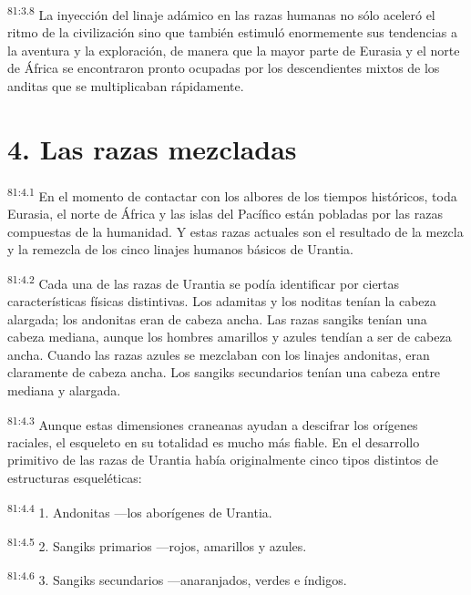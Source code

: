 \par
\textsuperscript{81:3.8} La inyección del linaje adámico en las razas humanas no sólo aceleró el ritmo de la civilización sino que también estimuló enormemente sus tendencias a la aventura y la exploración, de manera que la mayor parte de Eurasia y el norte de África se encontraron pronto ocupadas por los descendientes mixtos de los anditas que se multiplicaban rápidamente.

\section*{4. Las razas mezcladas}
\par
\textsuperscript{81:4.1} En el momento de contactar con los albores de los tiempos históricos, toda Eurasia, el norte de África y las islas del Pacífico están pobladas por las razas compuestas de la humanidad. Y estas razas actuales son el resultado de la mezcla y la remezcla de los cinco linajes humanos básicos de Urantia.

\par
\textsuperscript{81:4.2} Cada una de las razas de Urantia se podía identificar por ciertas características físicas distintivas. Los adamitas y los noditas tenían la cabeza alargada; los andonitas eran de cabeza ancha. Las razas sangiks tenían una cabeza mediana, aunque los hombres amarillos y azules tendían a ser de cabeza ancha. Cuando las razas azules se mezclaban con los linajes andonitas, eran claramente de cabeza ancha. Los sangiks secundarios tenían una cabeza entre mediana y alargada.

\par
\textsuperscript{81:4.3} Aunque estas dimensiones craneanas ayudan a descifrar los orígenes raciales, el esqueleto en su totalidad es mucho más fiable. En el desarrollo primitivo de las razas de Urantia había originalmente cinco tipos distintos de estructuras esqueléticas:

\par
\textsuperscript{81:4.4} 1. Andonitas ---los aborígenes de Urantia.

\par
\textsuperscript{81:4.5} 2. Sangiks primarios ---rojos, amarillos y azules.

\par
\textsuperscript{81:4.6} 3. Sangiks secundarios ---anaranjados, verdes e índigos.

